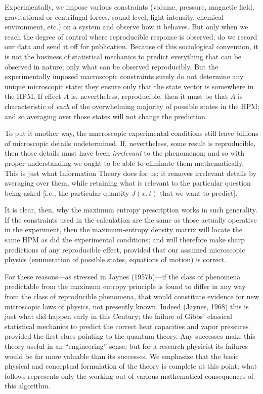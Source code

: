 Experimentally, we impose various constraints (volume, pressure, magnetic field, gravitational or centrifugal forces, sound level, light intensity, chemical environment, etc.) on a system and observe how it behaves.
But only when we reach the degree of control where reproducible response is observed, do we record our data and send it off for publication.
Because of this sociological convention, it is not the business of statistical mechanics to predict everything that can be observed in nature; only what can be observed reproducibly.
But the experimentally imposed macroscopic constraints surely do not determine any unique microscopic state; they ensure only that the state vector is somewhere in the HPM.
If effect $A$ is, nevertheless, reproducible, then it must be that $A$ is characteristic of \emph{each} of the overwhelming majority of possible states in the HPM; and so averaging over those states will not change the prediction.

To put it another way, the macroscopic experimental conditions still leave billions of microscopic details undetermined.
If, nevertheless, some result is reproducible, then those details must have been \emph{irrelevant} to the phenomenon; and so with proper understanding we ought to be able to eliminate them mathematically.
This is just what Information Theory does for us; it removes irrelevant details by averaging over them, while retaining what is relevant to the particular question being asked [i.e., the particular quantity $J(x,t)$ that we want to predict].


It is clear, then, why the maximum entropy prescription works in such generality.
If the constraints used in the calculation are the same as those actually operative in the experiment, then the maximum-entropy density matrix will locate the same HPM as did the experimental conditions; and will therefore make sharp predictions of any reproducible effect, provided that our assumed microscopic physics (enumeration of possible states, equations of motion) is correct.

For these reasons---as stressed in Jaynes (\cite{jaynes57}{1957b})---if the class of phenomena predictable from the maximum entropy principle is found to differ in any way from the class of reproducible phenomena, that would constitute evidence for new microscopic laws of physics, not presently known.
Indeed (Jaynes, \cite{jaynes68}{1968}) this is just what did happen early in this Century; the failure of Gibbs’ classical statistical mechanics to predict the correct heat capacities and vapor pressures provided the first clues pointing to the quantum theory.
Any successes make this theory useful in an ``engineering'' sense; but for a research physicist its failures would be far more valuable than its successes.
We emphasize that the basic physical and conceptual formulation of the theory is complete at this point; what follows represents only the working out of various mathematical consequences of this algorithm.


